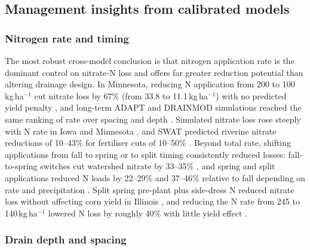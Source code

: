 \subsection{Management insights from calibrated models}

\subsubsection{Nitrogen rate and timing}

The most robust cross-model conclusion is that nitrogen application rate is the dominant control on nitrate-N loss and offers far greater reduction potential than altering drainage design. In Minnesota, reducing N application from 200 to 100\,kg\,ha$^{-1}$ cut nitrate loss by 67\% (from 33.8 to 11.1\,kg\,ha$^{-1}$) with no predicted yield penalty \parencite{Moriasi2013}, and long-term ADAPT and DRAINMOD simulations reached the same ranking of rate over spacing and depth \parencite{Davis2000,Ale2013}. Simulated nitrate loss rose steeply with N rate in Iowa and Minnesota \parencite{Bakhsh2004,Zhao2000}, and SWAT predicted riverine nitrate reductions of 10--43\% for fertiliser cuts of 10--50\% \parencite{Hu2007}. Beyond total rate, shifting applications from fall to spring or to split timing consistently reduced losses: fall-to-spring switches cut watershed nitrate by 33--35\% \parencite{Gowda2007,Nangia2010}, and spring and split applications reduced N loads by 22--29\% and 37--46\% relative to fall depending on rate and precipitation \parencite{Wilson2020}. Split spring pre-plant plus side-dress N reduced nitrate loss without affecting corn yield in Illinois \parencite{Singh2020b,Singh2022c}, and reducing the N rate from 245 to 140\,kg\,ha$^{-1}$ lowered N loss by roughly 40\% with little yield effect \parencite{Fang2012}.

\subsubsection{Drain depth and spacing}

